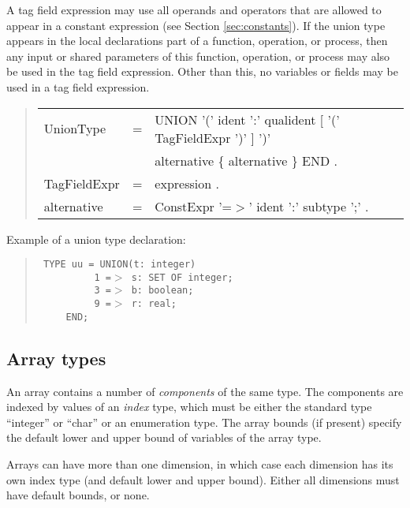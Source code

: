 \documentclass[10pt]{article}
\newenvironment{grammar}
{\begin{quote} \begin{tabular}{p{3.8cm} l l}}
{\end{tabular}\end{quote}}
\begin{document}
A tag field expression may use all operands and operators that
are allowed to appear in a constant expression (see Section \ref{sec:constants}).
If the union type appears in the local declarations part of a function,
operation, or process, then any input or shared
parameters of this function,
operation, or process may also be used in the tag field expression.
Other than this, no variables or fields may be used in a tag field
expression.
\begin{grammar}
UnionType & = & UNION '(' ident ':' qualident [ '(' TagFieldExpr ')' ] ')' \\
&&alternative \{ alternative \} END . \\
TagFieldExpr & = & expression . \\
alternative & = & ConstExpr '=$>$' ident ':' subtype ';' .
\end{grammar}
Example of a union type declaration:
\begin{quote}\tt
TYPE uu = UNION(t:~integer) \\
\mbox{~~~~~~~~~~}1 =$>$ s:~SET OF integer; \\
\mbox{~~~~~~~~~~}3 =$>$ b:~boolean; \\
\mbox{~~~~~~~~~~}9 =$>$ r:~real; \\
\mbox{~~~~~}END;
\end{quote}
\subsection{Array types}\label{sec:array_types}

An array contains a number of {\em components} of the same type.
The components are indexed by values of an {\em index} type,
which must be either the standard type ``integer'' or ``char''
or an enumeration type.
The array bounds (if present) specify the default lower and upper bound
of variables of the array type.

Arrays can have more than one dimension, in which case each dimension has
its own index type (and default lower and upper bound).
Either all dimensions must have default bounds, or none.
\end{document}
